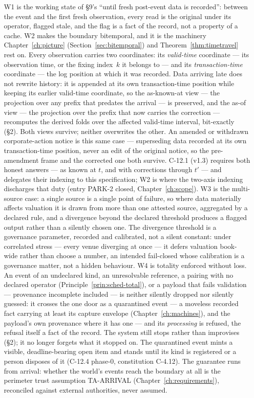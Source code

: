 \documentclass[11pt,a4paper]{article}
\begin{document}
\noindent W1 is the working state of \S 9's ``until fresh post-event data is recorded'':
between the event and the first fresh observation, every read is the original under its operator,
flagged stale, and the flag is a fact of the record, not a property of a cache. W2 makes the
boundary bitemporal, and it is the machinery Chapter~\ref{ch:picture}
(Section~\ref{sec:bitemporal}) and Theorem~\ref{thm:timetravel} rest on. Every observation
carries two coordinates: its \emph{valid-time} coordinate --- its observation time, or the
fixing index~$k$ it belongs to --- and its \emph{transaction-time} coordinate --- the log
position at which it was recorded. Data arriving late does not rewrite history: it is
appended at its own transaction-time position while keeping its earlier valid-time
coordinate, so the as-known-at view --- the projection over any prefix that predates the
arrival --- is preserved, and the as-of view --- the projection over the prefix that now
carries the correction --- recomputes the derived folds over the affected valid-time
interval, bit-exactly (\S 2). Both views survive; neither overwrites the other. An amended
or withdrawn corporate-action notice is this same case --- superseding data recorded at
its own transaction-time position, never an edit of the original notice, so the
pre-amendment frame and the corrected one both survive. C-12.1 (v1.3) requires both honest
answers --- as known at $t$, and with corrections through $t'$ --- and delegates their
indexing to this specification; W2 is where the two-axis indexing discharges that duty
(entry PARK-2 closed, Chapter~\ref{ch:scope}). W3 is the
multi-source case: a single source is a single point of
failure, so where data materially affects valuation it is drawn from more than one
attested source, aggregated by a declared rule, and a divergence beyond the declared
threshold produces a flagged output rather than a silently chosen one. The divergence
threshold is a governance parameter, recorded and calibrated, not a silent constant: under
correlated stress --- every venue diverging at once --- it defers valuation book-wide rather
than choose a number, an intended fail-closed whose calibration is a governance matter, not a
hidden behaviour. W4 is
totality enforced without loss. An event of an undeclared kind, an unresolvable reference,
a pairing with no declared operator (Principle~\ref{prin:sched-total}), or a payload that
fails validation --- provenance incomplete included --- is neither
silently dropped nor silently guessed: it crosses the one door as a quarantined event ---
a moveless recorded fact carrying at least its capture envelope
(Chapter~\ref{ch:machines}), and the payload's own provenance where it has one --- and its
\emph{processing} is refused, the refusal itself a fact of the record. The system still stops rather than improvises
(\S2); it no longer forgets what it stopped on. The quarantined event mints a visible,
deadline-bearing open item and stands until its kind is registered or a person disposes of
it (C-12.4 phase-0, constitution C-4.12). The guarantee runs from arrival: whether the
world's events reach the boundary at all is the perimeter trust assumption TA-ARRIVAL
(Chapter~\ref{ch:requirements}), reconciled against external authorities, never assumed.
\end{document}
